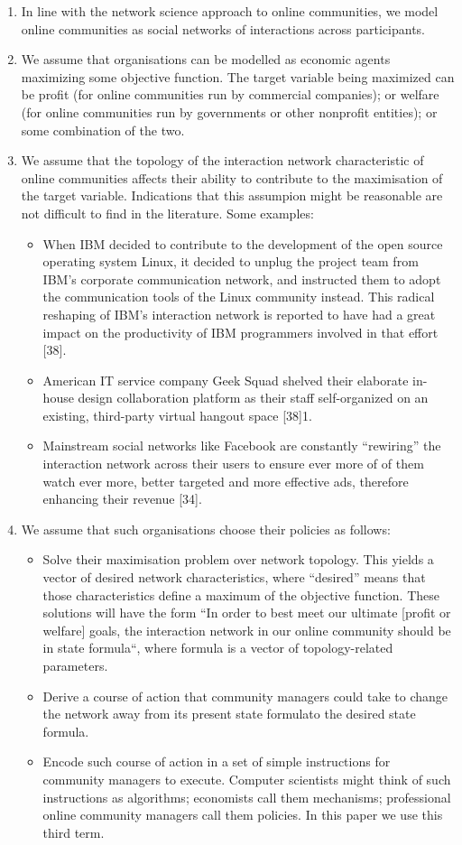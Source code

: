 \begin{enumerate}
\item In line with the network science approach to online communities, we model online communities as social networks of interactions across participants. 
\item We assume that organisations can be modelled as economic agents maximizing some objective function. The target variable being maximized can be profit (for online communities run by commercial companies); or welfare (for online communities run by governments or other nonprofit entities); or some combination of the two. 
\item We assume that the topology of the interaction network characteristic of online communities affects their ability to contribute to the maximisation of the target variable. Indications that this assumpion might be reasonable are not difficult to find in the literature. Some examples:
\begin{itemize}
	\item When IBM decided to contribute to the development of the open source operating system Linux, it decided to unplug the project team from IBM's corporate communication network, and instructed them to adopt the communication tools of the Linux community instead. This radical reshaping of IBM's interaction network is reported to have had a great impact on the productivity of IBM programmers involved in that effort [38]. 
	\item American IT service company Geek Squad shelved their elaborate in-house design collaboration platform as their staff self-organized on an existing, third-party virtual hangout space [38]1. 
	\item Mainstream social networks like Facebook are constantly “rewiring” the interaction network across their users to ensure ever more of of them watch ever more, better targeted and more effective ads, therefore enhancing their revenue [34]. 
	\end{itemize}
\item We assume that such organisations choose their policies as follows: 
\begin{itemize} 
	\item Solve their maximisation problem over network topology. This yields a vector of desired network characteristics, where “desired” means that those characteristics define a maximum of the objective function. These solutions will have the form “In order to best meet our ultimate [profit or welfare] goals, the interaction network in our online community should be in state formula“, where formula is a vector of topology-related parameters.
	\item Derive a course of action that community managers could take to change the network away from its present state formulato the desired state formula.
	\item Encode such course of action in a set of simple instructions for community managers to execute. Computer scientists might think of such instructions as algorithms; economists call them mechanisms; professional online community managers call them policies. In this paper we use this third term. 
\end{itemize}
\end{enumerate}

